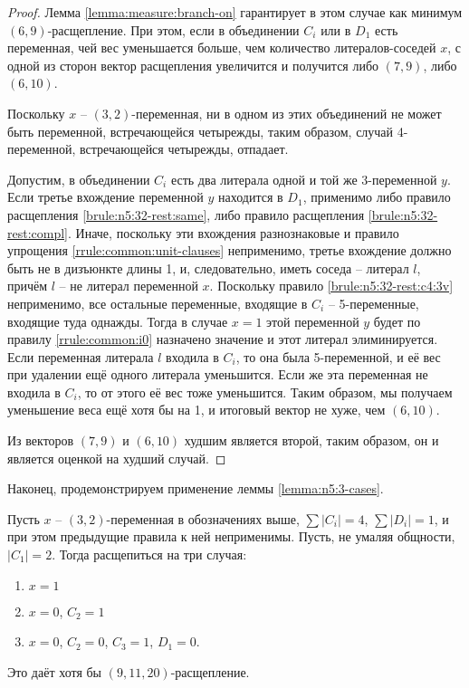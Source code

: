 \begin{proof}
 Лемма \ref{lemma:measure:branch-on} гарантирует в этом случае как минимум $(6,9)$-расщепление. При этом, если в объединении $C_i$ или в $D_1$ есть переменная, чей вес уменьшается больше, чем количество литералов-соседей $x$, с одной из сторон вектор расщепления увеличится и получится либо $(7,9)$, либо $(6,10)$.

 Поскольку $x$ -- $(3,2)$-переменная, ни в одном из этих объединений не может быть переменной, встречающейся четырежды, таким образом, случай 4-переменной, встречающейся четырежды, отпадает.

 Допустим, в объединении $C_i$ есть два литерала одной и той же 3-переменной $y$. Если третье вхождение переменной $y$ находится в $D_1$, применимо либо правило расщепления \ref{brule:n5:32-rest:same}, либо правило расщепления \ref{brule:n5:32-rest:compl}. Иначе, поскольку эти вхождения разнознаковые и правило упрощения \ref{rrule:common:unit-clauses} неприменимо, третье вхождение должно быть не в дизъюнкте длины 1, и, следовательно, иметь соседа -- литерал $l$, причём $l$ -- не литерал переменной $x$. Поскольку правило \ref{brule:n5:32-rest:c4:3v} неприменимо, все остальные переменные, входящие в $C_i$ -- 5-переменные, входящие туда однажды. Тогда в случае $x = 1$ этой переменной $y$ будет по правилу \ref{rrule:common:i0} назначено значение и этот литерал элиминируется. Если переменная литерала $l$ входила в $C_i$, то она была 5-переменной, и её вес при удалении ещё одного литерала уменьшится. Если же эта переменная не входила в $C_i$, то от этого её вес тоже уменьшится. Таким образом, мы получаем уменьшение веса ещё хотя бы на 1, и итоговый вектор не хуже, чем $(6,10)$.

 Из векторов $(7,9)$ и $(6,10)$ худшим является второй, таким образом, он и является оценкой на худший случай.
\end{proof}

Наконец, продемонстрируем применение леммы \ref{lemma:n5:3-cases}.

\begin{brule}
 Пусть $x$ -- $(3,2)$-переменная в обозначениях выше, $\sum |C_i| = 4$, $\sum |D_i| = 1$, и при этом предыдущие правила к ней неприменимы. Пусть, не умаляя общности, $|C_1| = 2$. Тогда расщепиться на три случая:

 \begin{enumerate}
  \item $x = 1$
  \item $x = 0$, $C_2 = 1$
  \item $x = 0$, $C_2 = 0$, $C_3 = 1$, $D_1 = 0$.
 \end{enumerate}

 Это даёт хотя бы $(9,11,20)$-расщепление.
 \label{brule:n5:32-rest:c4:3-cases}
\end{brule}

